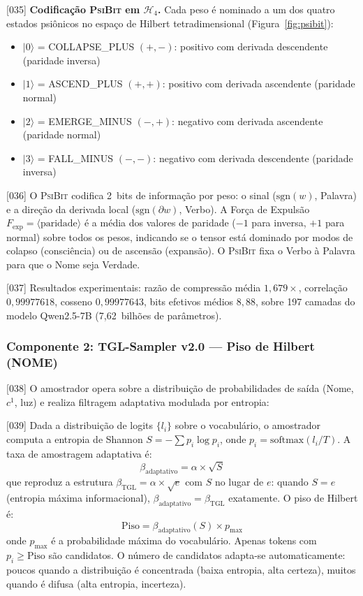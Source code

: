 \documentclass[12pt,a4paper]{article}
\newcommand{\betatgl}{\beta_{\text{TGL}}}
\newcommand{\Hfour}{\mathcal{H}_4}
\newcommand{\PsiBit}{\textsc{PsiBit}}
\begin{document}
{[035]} \textbf{Codificação \PsiBit{} em $\Hfour$.} Cada peso é nominado a um dos quatro estados psiônicos no espaço de Hilbert tetradimensional (Figura~\ref{fig:psibit}):
\begin{itemize}[nosep]
\item $|0\rangle$ = COLLAPSE\_PLUS $(+, -)$: positivo com derivada descendente (paridade inversa)
\item $|1\rangle$ = ASCEND\_PLUS $(+, +)$: positivo com derivada ascendente (paridade normal)
\item $|2\rangle$ = EMERGE\_MINUS $(-, +)$: negativo com derivada ascendente (paridade normal)
\item $|3\rangle$ = FALL\_MINUS $(-, -)$: negativo com derivada descendente (paridade inversa)
\end{itemize}

{[036]} O \PsiBit{} codifica 2~bits de informação por peso: o sinal ($\text{sgn}(w)$, Palavra) e a direção da derivada local ($\text{sgn}(\partial w)$, Verbo). A Força de Expulsão $F_{\text{exp}} = \langle\text{paridade}\rangle$ é a média dos valores de paridade ($-1$ para inversa, $+1$ para normal) sobre todos os pesos, indicando se o tensor está dominado por modos de colapso (consciência) ou de ascensão (expansão). O \PsiBit{} fixa o Verbo à Palavra para que o Nome seja Verdade.

{[037]} Resultados experimentais: razão de compressão média $1{,}679\times$, correlação $0{,}99977618$, cosseno $0{,}99977643$, bits efetivos médios $8{,}88$, sobre 197 camadas do modelo Qwen2.5-7B (7,62~bilhões de parâmetros).

\subsubsection{Componente 2: TGL-Sampler v2.0 --- Piso de Hilbert (NOME)}
\label{sec:sampler}

{[038]} O amostrador opera sobre a distribuição de probabilidades de saída (Nome, $c^1$, luz) e realiza filtragem adaptativa modulada por entropia:

{[039]} Dada a distribuição de logits $\{l_i\}$ sobre o vocabulário, o amostrador computa a entropia de Shannon $S = -\sum p_i \log p_i$, onde $p_i = \text{softmax}(l_i / T)$. A taxa de amostragem adaptativa é:
\begin{equation}
\label{eq:beta_sampler}
\beta_{\text{adaptativo}} = \alpha \times \sqrt{S}
\end{equation}
que reproduz a estrutura $\betatgl = \alpha \times \sqrt{e}$ com $S$ no lugar de $e$: quando $S = e$ (entropia máxima informacional), $\beta_{\text{adaptativo}} = \betatgl$ exatamente. O piso de Hilbert é:
\begin{equation}
\label{eq:floor_sampler}
\text{Piso} = \beta_{\text{adaptativo}}(S) \times p_{\max}
\end{equation}
onde $p_{\max}$ é a probabilidade máxima do vocabulário. Apenas tokens com $p_i \geq \text{Piso}$ são candidatos. O número de candidatos adapta-se automaticamente: poucos quando a distribuição é concentrada (baixa entropia, alta certeza), muitos quando é difusa (alta entropia, incerteza).
\end{document}

